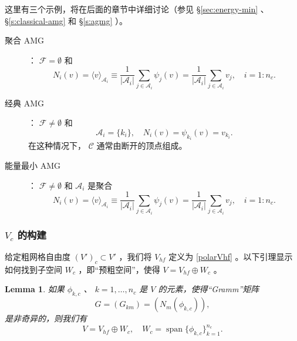\documentclass[12pt]{acta_2011xz}
\newcommand{\dof}{\ensuremath{N}}
\newtheorem{lemma}[theorem]{Lemma}
\begin{document}
这里有三个示例，将在后面的章节中详细讨论（参见    \S       \ref{sec:energy-min}    、    \S       \ref{s:classical-amg}    和
   \S       \ref{s:agmg}    ）。
   \begin{description}   \item    [聚合 AMG]：   $\mathcal F=\emptyset$    和 
   \begin{equation}
    \label{AggNi}
\dof_i(v)=\langle v\rangle_{\mathcal A_i}\equiv \frac{1}{|\mathcal
  A_i|}\sum_{j\in \mathcal A_i} \psi_{j}(v) = \frac{1}{|\mathcal
  A_i|}\sum_{j\in \mathcal A_i}v_j , \quad i=1:n_c. 
  \end{equation}    

   \item    [经典 AMG]：   $\mathcal F\neq\emptyset$    和 
   \begin{equation}
    \label{ClassicalNi}
      \mathcal A_i= \{ k_i \} , \quad \dof_i(v)=\psi_{k_i}(v)=v_{k_i}.    
  \end{equation}    在这种情况下，   $\mathcal C$    通常由断开的顶点组成。
   \item    [能量最小 AMG]：   $\mathcal F\ne \emptyset $    和    $\mathcal A_i$    是聚合
   \begin{equation}
\dof_i(v)=\langle v\rangle_{\mathcal A_i}\equiv \frac{1}{|\mathcal
  A_i|}\sum_{j\in \mathcal A_i} \psi_{j}(v) = \frac{1}{|\mathcal
  A_i|}\sum_{j\in \mathcal A_i}v_j , \quad i=1:n_c. 
    \end{equation}     \end{description}     

   \subsubsection{   $V_c$    的构建  }     

给定粗网格自由度    $(V')_c\subset V'$    ，我们将    $V_{hf}$    定义为    \eqref{polarVhf}    。以下引理显示如何找到子空间    $W_c$    ，即“预粗空间”，使得
   $V=V_{hf}\oplus W_c$    。
   \begin{lemma}   \label{lemma:direct-sum}    如果    $\phi_{k,c}$   、   $k=1,\ldots,
n_c$    是    $V$    的元素，使得“Gramm”矩阵
   \[ G=(G_{km})=(\dof_m(\phi_{k,c})),
\]    是非奇异的，则我们有
   \[ V=V_{hf} \oplus W_c, \quad W_c =
\operatorname{span} \{ \phi_{k,c} \} _{k=1}^{n_c}.
\]     \end{lemma}     
\end{document}
